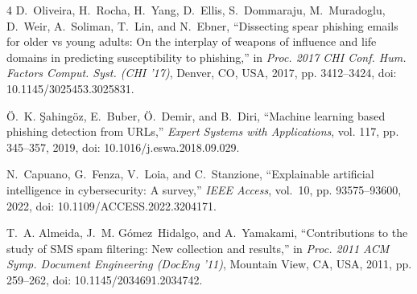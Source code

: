 \documentclass[conference]{IEEEtran}
\begin{document}
\begin{thebibliography}{4}
D.~Oliveira, H.~Rocha, H.~Yang, D.~Ellis, S.~Dommaraju, M.~Muradoglu, D.~Weir, A.~Soliman, T.~Lin, and N.~Ebner, ``Dissecting spear phishing emails for older vs young adults: On the interplay of weapons of influence and life domains in predicting susceptibility to phishing,'' in \emph{Proc. 2017 CHI Conf. Hum. Factors Comput. Syst. (CHI '17)}, Denver, CO, USA, 2017, pp. 3412--3424, doi: 10.1145/3025453.3025831.

\"{O}.~K. \c{S}ahing\"{o}z, E.~Buber, \"{O}.~Demir, and B.~Diri, ``Machine learning based phishing detection from {URLs},'' \emph{Expert Systems with Applications}, vol. 117, pp. 345--357, 2019, doi: 10.1016/j.eswa.2018.09.029.

N.~Capuano, G.~Fenza, V.~Loia, and C.~Stanzione, ``Explainable artificial intelligence in cybersecurity: A survey,'' \emph{IEEE Access}, vol.~10, pp. 93575--93600, 2022, doi: 10.1109/ACCESS.2022.3204171.

T.~A. Almeida, J.~M. G\'{o}mez~Hidalgo, and A.~Yamakami, ``Contributions to the study of {SMS} spam filtering: New collection and results,'' in \emph{Proc. 2011 ACM Symp. Document Engineering (DocEng '11)}, Mountain View, CA, USA, 2011, pp. 259--262, doi: 10.1145/2034691.2034742.
\end{thebibliography}
\end{document}
